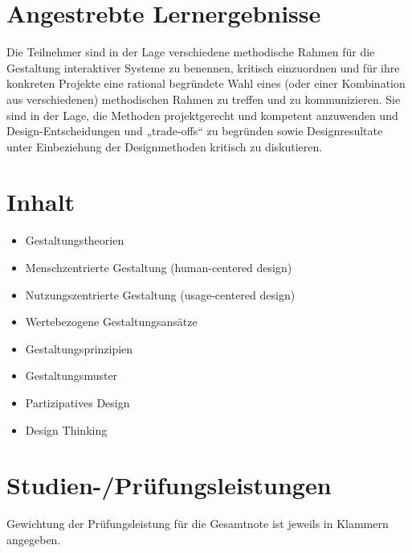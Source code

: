 \section*{Angestrebte
Lernergebnisse\label{/mi-2017/modulbeschreibungen-master/MA_HCI_Design_Methodologies}}\label{angestrebte-lernergebnissepathlabelmi-2017modulbeschreibungen-mastermaux5fhciux5fdesignux5fmethodologies}

Die Teilnehmer sind in der Lage verschiedene methodische Rahmen für die
Gestaltung interaktiver Systeme zu benennen, kritisch einzuordnen und
für ihre konkreten Projekte eine rational begründete Wahl eines (oder
einer Kombination aus verschiedenen) methodischen Rahmen zu treffen und
zu kommunizieren. Sie sind in der Lage, die Methoden projektgerecht und
kompetent anzuwenden und Design-Entscheidungen und „trade-offs`` zu
begründen sowie Designresultate unter Einbeziehung der Designmethoden
kritisch zu diskutieren.

\section*{Inhalt\label{/mi-2017/modulbeschreibungen-master/MA_HCI_Design_Methodologies}}\label{inhaltpathlabelmi-2017modulbeschreibungen-mastermaux5fhciux5fdesignux5fmethodologies}

\begin{itemize}
\tightlist
\item
  Gestaltungstheorien
\item
  Menschzentrierte Gestaltung (human-centered design)
\item
  Nutzungszentrierte Gestaltung (usage-centered design)
\item
  Wertebezogene Gestaltungsansätze
\item
  Gestaltungsprinzipien
\item
  Gestaltungsmuster
\item
  Partizipatives Design
\item
  Design Thinking
\end{itemize}

\section*{Studien-/Prüfungsleistungen\label{/mi-2017/modulbeschreibungen-master/MA_HCI_Design_Methodologies}}\label{studien-pruxfcfungsleistungenpathlabelmi-2017modulbeschreibungen-mastermaux5fhciux5fdesignux5fmethodologies}

Gewichtung der Prüfungsleistung für die Gesamtnote ist jeweils in
Klammern angegeben.

